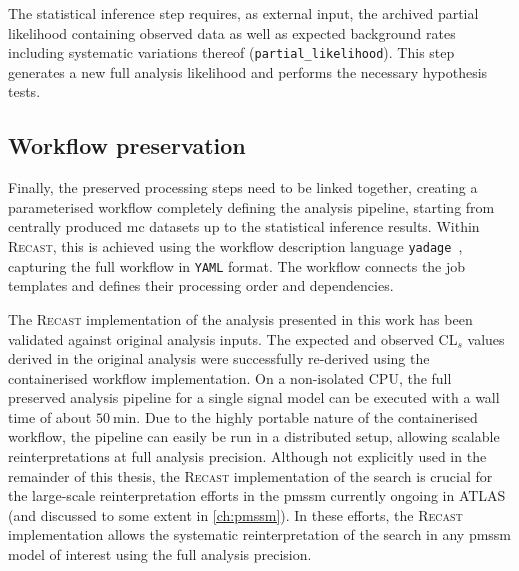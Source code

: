 The statistical inference step requires, as external input, the archived partial likelihood containing observed data as well as expected background rates including systematic variations thereof (\texttt{partial\_likelihood}). This step generates a new full analysis likelihood and performs the necessary hypothesis tests.  

\subsection{Workflow preservation}

Finally, the preserved processing steps need to be linked together, creating a parameterised workflow completely defining the analysis pipeline, starting from centrally produced \gls{mc} datasets up to the statistical inference results. Within \textsc{Recast}, this is achieved using the workflow description language \texttt{yadage}~\cite{yadage:2017frf}, capturing the full workflow in \texttt{YAML} format. The workflow connects the job templates and defines their processing order and dependencies.

The \textsc{Recast} implementation of the analysis presented in this work has been validated against original analysis inputs. The expected and observed CL$_s$ values derived in the original analysis were successfully re-derived using the containerised workflow implementation. On a non-isolated CPU, the full preserved analysis pipeline for a single signal model can be executed with a wall time of about $\SI{50}{\minute}$. Due to the highly portable nature of the containerised workflow, the pipeline can easily be run in a distributed setup, allowing scalable reinterpretations at full analysis precision. Although not explicitly used in the remainder of this thesis, the \textsc{Recast} implementation of the \onelepton search is crucial for the large-scale reinterpretation efforts in the \gls{pmssm} currently ongoing in ATLAS (and discussed to some extent in \cref{ch:pmssm}). In these efforts, the \textsc{Recast} implementation allows the systematic reinterpretation of the \onelepton search in any \gls{pmssm} model of interest using the full analysis precision.



